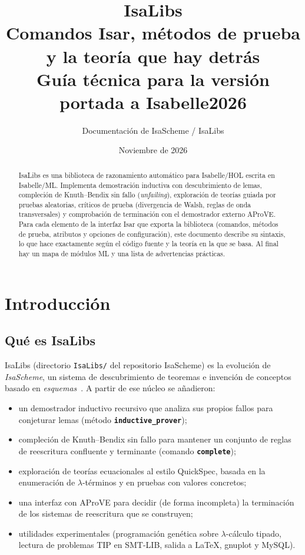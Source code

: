 \documentclass[11pt,a4paper]{article}
\title{\textbf{IsaLibs}\\[2pt] Comandos Isar, métodos de prueba\\ y la teoría que hay detrás\\[4pt]
\large Guía técnica para la versión portada a Isabelle2026}
\author{Documentación de IsaScheme / IsaLibs}
\date{Noviembre de 2026}
\newcommand{\isa}[1]{\texttt{#1}}
\newcommand{\cmd}[1]{\textbf{\texttt{#1}}}
\theoremstyle{definition}
\theoremstyle{remark}
\begin{document}
\maketitle

\begin{abstract}
IsaLibs es una biblioteca de razonamiento automático para Isabelle/HOL escrita
en Isabelle/ML. Implementa demostración inductiva con descubrimiento de lemas,
compleción de Knuth--Bendix sin fallo (\emph{unfailing}), exploración de teorías
guiada por pruebas aleatorias, críticos de prueba (divergencia de Walsh, reglas de
onda transversales) y comprobación de terminación con el demostrador externo AProVE.
Para cada elemento de la interfaz Isar que exporta la biblioteca (comandos, métodos
de prueba, atributos y opciones de configuración), este documento describe su
sintaxis, lo que hace exactamente según el código fuente y la teoría en la que se
basa. Al
final hay un mapa de módulos ML y una lista de advertencias prácticas.
\end{abstract}

\tableofcontents
\newpage

\section{Introducción}

\subsection{Qué es IsaLibs}

IsaLibs (directorio \isa{IsaLibs/} del repositorio IsaScheme) es la evolución de
\emph{IsaScheme}, un sistema de descubrimiento de teoremas e invención de conceptos
basado en \emph{esquemas}~\cite{montano2012}. A partir de ese núcleo se añadieron:
\begin{itemize}[nosep]
  \item un demostrador inductivo recursivo que analiza sus propios fallos para
        conjeturar lemas (método \cmd{inductive\_prover});
  \item compleción de Knuth--Bendix sin fallo para mantener un conjunto de
        reglas de reescritura confluente y terminante (comando \cmd{complete});
  \item exploración de teorías ecuacionales al estilo QuickSpec, basada en la
        enumeración de $\lambda$-términos y en pruebas con valores concretos;
  \item una interfaz con AProVE para decidir (de forma incompleta) la terminación
        de los sistemas de reescritura que se construyen;
  \item utilidades experimentales (programación genética sobre $\lambda$-cálculo
        tipado, lectura de problemas TIP en SMT-LIB, salida a \LaTeX, gnuplot y MySQL).
\end{itemize}
\end{document}
